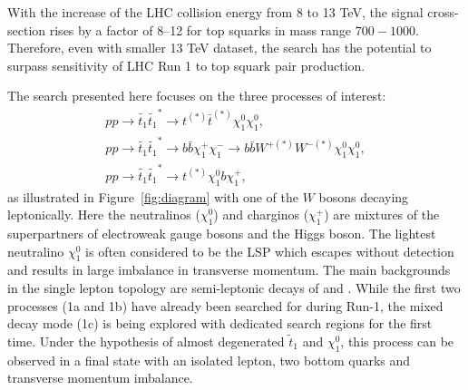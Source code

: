 With the increase of the LHC collision energy from 8 to 13 TeV, the signal cross-section rises by a factor of 8--12 for top
squarks in mass range $700-1000$\GeV. Therefore, even with smaller 13 TeV dataset, the search has the potential to surpass sensitivity
of LHC Run 1 to top squark pair production.

The search presented here focuses on the three processes of interest:
\begin{subequations}
\begin{align}
\label{sgnProc}
pp\rightarrow\tilde{t_1}\tilde{t_1}^*\rightarrow t^{(*)}\bar{t}^{(*)}\chi^0_1\chi^0_1, \\
pp\rightarrow\tilde{t_1}\tilde{t_1}^*\rightarrow b\bar{b}\chi^+_1\chi^-_1 \rightarrow b\bar{b}W^{+(*)}W^{-(*)} \chi^0_1\chi^0_1,\\
pp\rightarrow\tilde{t_1}\tilde{t_1}^*\rightarrow t^{(*)}\chi^0_1b\chi^+_1,
\end{align}
\end{subequations}
as illustrated in Figure~\ref{fig:diagram} with one of the $W$ bosons decaying leptonically.
Here the neutralinos ($\chi^0_1$) and charginos ($\chi^+_1$) are mixtures of the superpartners
of electroweak gauge bosons and the Higgs boson. The lightest neutralino $\chi^0_1$ is often considered to be the LSP
which escapes without detection and results in large imbalance in transverse momentum. The main backgrounds in the single lepton
topology are semi-leptonic decays of \ttbar and \wjets. While the first two processes (1a and 1b) have
already been searched for during Run-1, the mixed decay mode (1c) is being explored with dedicated search regions for the first time.
Under the hypothesis of almost degenerated $\tilde{t}_{1}$ and $\chi_{1}^{0}$, this process can be observed in a final state with an
isolated lepton, two bottom quarks and transverse momentum imbalance.
